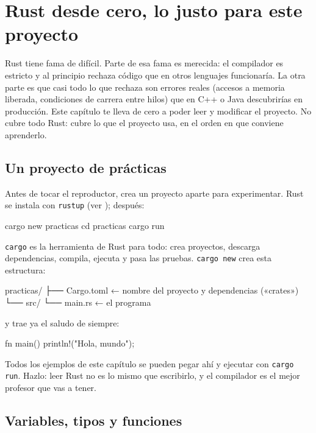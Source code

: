 \chapter{Rust desde cero, lo justo para este proyecto}
\label{cap:rust}

Rust tiene fama de difícil. Parte de esa fama es merecida: el compilador es estricto y al
principio rechaza código que en otros lenguajes funcionaría. La otra parte es que casi todo lo
que rechaza son errores reales (accesos a memoria liberada, condiciones de carrera entre
hilos) que en C++ o Java descubrirías en producción. Este capítulo te lleva de cero a poder
leer y modificar el proyecto. No cubre todo Rust: cubre lo que el proyecto usa, en el orden en
que conviene aprenderlo.

\section{Un proyecto de prácticas}

Antes de tocar el reproductor, crea un proyecto aparte para experimentar. Rust se instala con
\texttt{rustup} (ver ); después:

\begin{terminal}
cargo new practicas
cd practicas
cargo run
\end{terminal}

\texttt{cargo} es la herramienta de Rust para todo: crea proyectos, descarga dependencias,
compila, ejecuta y pasa las pruebas. \texttt{cargo new} crea esta estructura:

\begin{codigo}
practicas/
├── Cargo.toml      ← nombre del proyecto y dependencias («crates»)
└── src/
    └── main.rs     ← el programa
\end{codigo}

y  trae ya el saludo de siempre:

\begin{rust}
fn main() {
    println!("Hola, mundo");
}
\end{rust}

Todos los ejemplos de este capítulo se pueden pegar ahí y ejecutar con \texttt{cargo run}. Hazlo:
leer Rust no es lo mismo que escribirlo, y el compilador es el mejor profesor que vas a tener.

\section{Variables, tipos y funciones}

